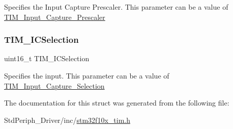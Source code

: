 Specifies the Input Capture Prescaler. This parameter can be a value of \mbox{\hyperlink{group___t_i_m___input___capture___prescaler}{T\+I\+M\+\_\+\+Input\+\_\+\+Capture\+\_\+\+Prescaler}} \mbox{\label{struct_t_i_m___i_c_init_type_def_a052908740c8c618054ef82b3ec89e9b3}} 
\subsubsection{\texorpdfstring{TIM\_ICSelection}{TIM\_ICSelection}}
{\footnotesize\ttfamily uint16\+\_\+t T\+I\+M\+\_\+\+I\+C\+Selection}

Specifies the input. This parameter can be a value of \mbox{\hyperlink{group___t_i_m___input___capture___selection}{T\+I\+M\+\_\+\+Input\+\_\+\+Capture\+\_\+\+Selection}} 

The documentation for this struct was generated from the following file\+:\begin{DoxyCompactItemize}
\item 
Std\+Periph\+\_\+\+Driver/inc/\mbox{\hyperlink{stm32f10x__tim_8h}{stm32f10x\+\_\+tim.\+h}}\end{DoxyCompactItemize}
